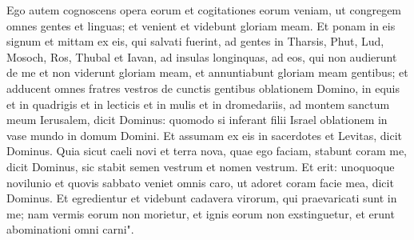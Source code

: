 \begin{biblechapter}
\verse Ego autem cognoscens opera eorum et cogitationes eorum veniam, ut congregem omnes gentes et linguas; et venient et videbunt gloriam meam. 
\verse Et ponam in eis signum et mittam ex eis, qui salvati fuerint, ad gentes in Tharsis, Phut, Lud, Mosoch, Ros, Thubal et Iavan, ad insulas longinquas, ad eos, qui non audierunt de me et non viderunt gloriam meam, et annuntiabunt gloriam meam gentibus; 
\verse et adducent omnes fratres vestros de cunctis gentibus oblationem Domino, in equis et in quadrigis et in lecticis et in mulis et in dromedariis, ad montem sanctum meum Ierusalem, dicit Dominus: quomodo si inferant filii Israel oblationem in vase mundo in domum Domini. 
\verse Et assumam ex eis in sacerdotes et Levitas, dicit Dominus. 
\verse Quia sicut caeli novi et terra nova, quae ego faciam, stabunt coram me, dicit Dominus, sic stabit semen vestrum et nomen vestrum. 
\verse Et erit: unoquoque novilunio et quovis sabbato veniet omnis caro, ut adoret coram facie mea, dicit Dominus. 
\verse Et egredientur et videbunt cadavera virorum, qui praevaricati sunt in me; nam vermis eorum non morietur, et ignis eorum non exstinguetur, et erunt abominationi omni carni".
\end{biblechapter}
